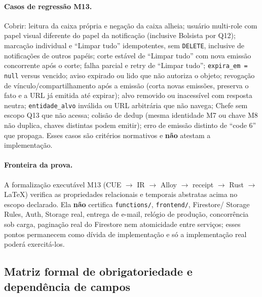 \paragraph{Casos de regressão M13.}
Cobrir: leitura da caixa própria e negação da caixa alheia; usuário multi-role
com papel visual diferente do papel da notificação (inclusive Bolsista por Q12);
marcação individual e ``Limpar tudo'' idempotentes, sem \texttt{DELETE},
inclusive de notificações de outros papéis; corte estável de ``Limpar tudo''
com nova emissão concorrente após o corte; falha parcial e retry de ``Limpar
tudo''; \texttt{expira\_em = null} versus vencido; aviso expirado ou lido que não
autoriza o objeto; revogação de vínculo/compartilhamento após a emissão (corta
novas emissões, preserva o fato e a URL já emitida até expirar); alvo removido ou
inacessível com resposta neutra; \texttt{entidade\_alvo} inválida ou URL
arbitrária que não navega; Chefe sem escopo Q13 que não acessa; colisão de dedup
(mesma identidade M7 ou chave M8 não duplica, chaves distintas podem emitir);
erro de emissão distinto de ``code 6'' que propaga. Esses casos são critérios
normativos e \textbf{não} atestam a implementação.

\paragraph{Fronteira da prova.}
A formalização executável M13 (CUE $\rightarrow$ IR $\rightarrow$ Alloy
$\rightarrow$ receipt $\rightarrow$ Rust $\rightarrow$ LaTeX) verifica as
propriedades relacionais e temporais abstratas acima no escopo declarado. Ela
\textbf{não} certifica \texttt{functions/}, \texttt{frontend/}, Firestore/
Storage Rules, Auth, Storage real, entrega de e-mail, relógio de produção,
concorrência sob carga, paginação real do Firestore nem atomicidade entre
serviços; esses pontos permanecem como dívida de implementação e só a
implementação real poderá exercitá-los.

\subsection{Matriz formal de obrigatoriedade e dependência de campos}

\small

